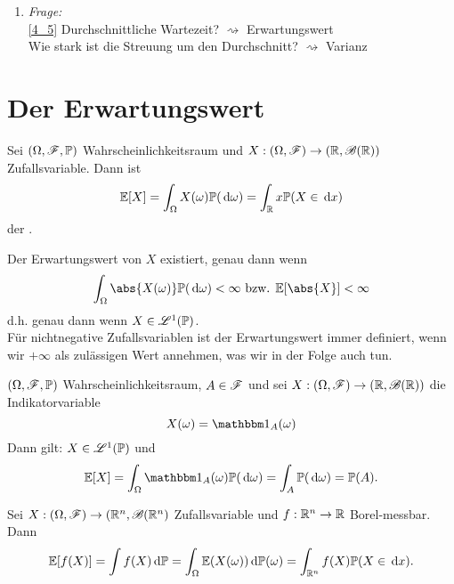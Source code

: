 \begin{enumerate}
	\item \emph{Frage:} \\
	\cref{4_5} Durchschnittliche Wartezeit? $\rightsquigarrow$ Erwartungswert\\
	Wie stark ist die Streuung um den Durchschnitt? $\rightsquigarrow$ Varianz
\end{enumerate}
\section{Der Erwartungswert}
\begin{definition}[Erwartungswert]
	Sei $(\Omega, \mathscr F, \mathbb{P})$ Wahrscheinlichkeitsraum und $X: (\Omega, \mathscr F) \to (\mathbb{R}, \mathscr{B}(\mathbb{R}))$ Zufallsvariable. Dann ist
	\begin{align*}
		\mathbb{E}[X] = \int_{\Omega} X(\omega) \mathbb{P}(\,\mathrm{d} \omega) = \int_{\mathbb{R}} x \mathbb{P}(X  \in \,\mathrm{d} x)
	\end{align*}
	der .
\end{definition}
\begin{*hint}
	Der Erwartungswert von $X$ existiert, genau dann wenn
	\begin{align*}
		\int_{\O} \abs{X(\omega)}\P(\d \omega) < \infty \bzw \E[\abs{X}] < \infty
	\end{align*}
	d.h. genau dann wenn $X \in \mathscr{L}^{1} (\mathbb{P})$.\\
	Für nichtnegative Zufallsvariablen ist der Erwartungswert immer definiert, wenn wir $+\infty$ als zulässigen Wert annehmen, was wir in der Folge auch tun.
\end{*hint}
\begin{example}
	$(\Omega, \mathscr F, \mathbb{P})$ Wahrscheinlichkeitsraum, $A \in \mathscr F$ und sei $X: (\Omega, \mathscr F) \to (\mathbb{R}, \mathscr{B}(\mathbb{R}))$ die Indikatorvariable
	\[
		X(\omega) = \indi_{A} (\omega)
	\]
	Dann gilt: $X \in \mathscr{L}^{1}(\mathbb{P})$ und
	\begin{align*}
		\E[X] = \int_{\O} \indi_{A} (\omega) \P(\d \omega) = \int_{A} \P(\d \omega) = \P(A).
	\end{align*}
\end{example}
\begin{proposition}
	Sei $X: (\Omega, \mathscr F) \to (\mathbb{R}^n, \mathscr{B}(\mathbb{R}^n)$ Zufallsvariable und $f: \mathbb{R}^n \to \mathbb{R}$ Borel-messbar. Dann
	\begin{align*}
		\mathbb{E}[f(X)] = \int f(X)\,\mathrm{d} \mathbb{P} = \int_{\Omega} \mathbb{E}(X(\omega)) \,\mathrm{d} \mathbb{P}(\omega) = \int_{\mathbb{R}^n} f(X) \mathbb{P}(X \in \,\mathrm{d} x). 
	\end{align*}
\end{proposition}
